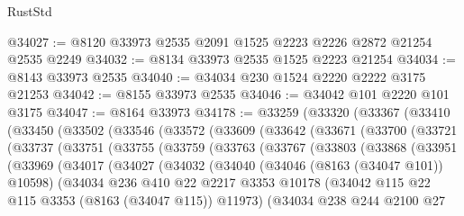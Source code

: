 \begin{lexlean}{RustStd}
\begin{coremodule}
@34027 := @8120 @33973 @2535 @2091 @1525 @2223 @2226 @2872 @21254 @2535 @2249
@34032 := @8134 @33973 @2535 @1525 @2223 @21254
@34034 := @8143 @33973 @2535
@34040 := @34034 @230 @1524 @2220 @2222 @3175 @21253
@34042 := @8155 @33973 @2535
@34046 := @34042 @101 @2220 @101 @3175
@34047 := @8164 @33973
@34178 := @33259
    (@33320
      (@33367
        (@33410
          (@33450
            (@33502
              (@33546
                (@33572
                  (@33609
                    (@33642
                      (@33671
                        (@33700
                          (@33721
                            (@33737
                              (@33751
                                (@33755
                                  (@33759
                                    (@33763
                                      (@33767
                                        (@33803
                                          (@33868
                                            (@33951
                                              (@33969
                                                (@34017
                                                  (@34027
                                                    (@34032
                                                      (@34040
                                                        (@34046 (@8163 (@34047 @101)) @10598)
                                                        (@34034
                                                          @236
                                                          @410
                                                          @22
                                                          @2217
                                                          @3353
                                                          @10178
                                                          (@34042
                                                            @115
                                                            @22
                                                            @115
                                                            @3353
                                                            (@8163 (@34047 @115))
                                                            @11973)
                                                          (@34034
                                                            @238
                                                            @244
                                                            @2100
                                                            @27

\end{coremodule}
\end{lexlean}

